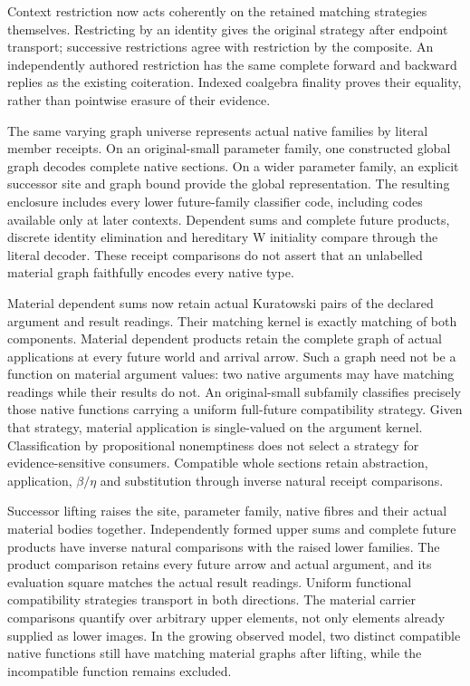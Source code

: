 \documentclass[11pt]{article}
\theoremstyle{definition}
\theoremstyle{remark}
\begin{document}
Context restriction now acts coherently on the retained matching strategies
themselves.  Restricting by an identity gives the original strategy after
endpoint transport; successive restrictions agree with restriction by the
composite.  An independently authored restriction has the same complete
forward and backward replies as the existing coiteration.  Indexed coalgebra
finality proves their equality, rather than pointwise erasure of their evidence.

The same varying graph universe represents actual native families by literal
member receipts.  On an original-small parameter family, one constructed
global graph decodes complete native sections.  On a wider parameter family,
an explicit successor site and graph bound provide the global representation.
The resulting enclosure includes every lower future-family classifier code,
including codes available only at later contexts.  Dependent sums and complete
future products, discrete identity elimination and hereditary W initiality
compare through the literal decoder.  These receipt comparisons do not assert
that an unlabelled material graph faithfully encodes every native type.

Material dependent sums now retain actual Kuratowski pairs of the declared
argument and result readings.  Their matching kernel is exactly matching of
both components.  Material dependent products retain the complete graph of
actual applications at every future world and arrival arrow.  Such a graph
need not be a function on material argument values: two native arguments may
have matching readings while their results do not.  An original-small
subfamily classifies precisely those native functions carrying a uniform
full-future compatibility strategy.  Given that strategy, material application
is single-valued on the argument kernel.  Classification by propositional
nonemptiness does not select a strategy for evidence-sensitive consumers.
Compatible whole sections retain abstraction, application, $\beta/\eta$ and
substitution through inverse natural receipt comparisons.

Successor lifting raises the site, parameter family, native fibres and their
actual material bodies together.  Independently formed upper sums and complete
future products have inverse natural comparisons with the raised lower
families.  The product comparison retains every future arrow and actual
argument, and its evaluation square matches the actual result readings.
Uniform functional compatibility strategies transport in both directions.
The material carrier comparisons quantify over arbitrary upper elements,
not only elements already supplied as lower images.  In the growing observed
model, two distinct compatible native functions still have matching material
graphs after lifting, while the incompatible function remains excluded.
\end{document}
